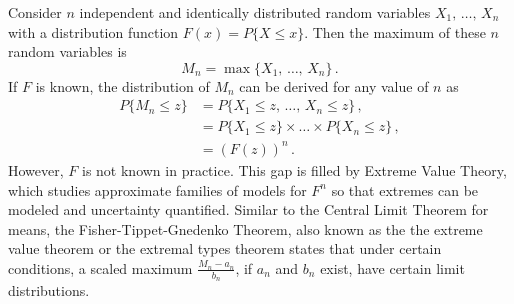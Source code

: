 \documentclass[letter,12pt]{article}
\begin{document}
Consider $n$ independent and identically distributed random variables $X_1, \, \ldots, \,  X_n$ with a distribution function $F(x) = P\{X \leq x\}$. Then the maximum of these $n$ random variables is  
\begin{equation}\label{eq:evt1}
    M_n = \max \{X_1, \, \ldots, \, X_n\} \, . 
\end{equation}
If $F$ is known, the distribution of $M_n$ can be derived for any value of $n$ as
\begin{align}\label{eq:evt2}
    P\{M_n \leq z \} & = P\{X_1 \leq z, \, \ldots, \, X_n \leq z \} \, ,  \\
    & = P\{X_1 \leq z\} \times \ldots \times P\{X_n \leq z\}\, , \\
    & =  \left(F(z)\right)^n \, .
\end{align}
However, $F$ is not known in practice. This gap is filled by Extreme Value Theory, which studies approximate families of models for $F^n$ so that extremes can be modeled and uncertainty quantified. Similar to the Central Limit Theorem for means, the Fisher-Tippet-Gnedenko Theorem, also known as the the extreme value theorem or the extremal types theorem states that under certain conditions, a scaled maximum $\frac{M_n - a_n}{b_n}$, if $a_n$ and $b_n$ exist, have certain limit distributions. 
\end{document}
